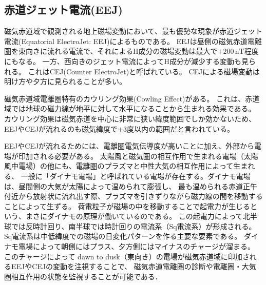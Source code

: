 \subsection{赤道ジェット電流(EEJ)}
磁気赤道域で観測される地上磁場変動において、最も優勢な現象が赤道ジェット電流(Equatorial ElectroJet: EEJ)によるものである。
EEJは昼側の磁気赤道電離圏を東向きに流れる電流で、それによるH成分の磁場変動は最大で$+200$\,nT程度にもなる。
一方、西向きのジェット電流によってH成分が減少する変動も見られる。
これはCEJ(Counter ElectroJet)と呼ばれている。
CEJによる磁場変動は明け方や夕方に見られることが多い。

磁気赤道域電離圏特有のカウリング効果(Cowling Effect)がある。
これは、赤道域では地球の磁力線が地平に対して水平になることから生まれる効果である。
カウリング効果は磁気赤道を中心に非常に狭い緯度範囲でしか効かないため、EEJやCEJが流れるのも磁気緯度で$\pm 3$度以内の範囲だと言われている。

EEJやCEJが流れるためには、電離圏電気伝導度が高いことに加え、外部から電場が印加される必要がある。
太陽風と磁気圏の相互作用で生まれる電場（太陽風中電場）の他にも、電離圏のプラズマと中性大気の相互作用によって生まれる、
一般に「ダイナモ電場」と呼ばれている電場が存在する。ダイナモ電場は、昼間側の大気が太陽によって温められて膨張し、
最も温められる赤道正午付近から放射状に流れ出す際、プラズマを引きずりながら磁力線の間を移動することによって生ずる。
荷電粒子が磁場の中を移動することで起電力が生じるという、まさにダイナモの原理が働いているのである。
この起電力によって北半球では反時計回り、南半球では時計回りの電流系（Sq電流系）が形成される。
Sq電流系は中低緯度での磁場の日変化パターンを作る主要な要素である。
ダイナモ電場によって朝側にはプラス、夕方側にはマイナスのチャージが溜まる。
このチャージによって dawn to dusk（東向き）の電場が磁気赤道域に印加されるEEJやCEJの変動を注視することで、
磁気赤道電離圏の診断や電離圏・大気圏相互作用の状態を監視することが可能である．

